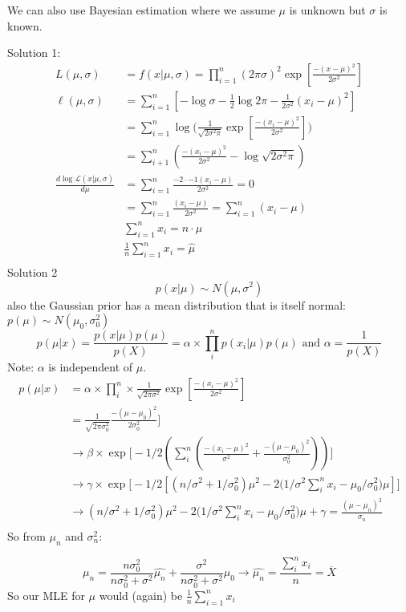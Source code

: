 \documentclass[draft]{exam} %
\theoremstyle{definition} \newtheorem*{defn}{Definition}
\begin{document}
\begin{questions}
\begin{solution}
We can also use Bayesian estimation where we assume $\mu$ is unknown but
$\sigma$ is known.

Solution 1:
\begin{align*}
L(\mu, \sigma) &= f(x|\mu,\sigma)= \prod_{i=1}^n (2\pi \sigma)^2 \exp [\frac{-(x-\mu)^2}{2\sigma^2}]\\
\ell(\mu,\sigma) &=\sum_{i=1}^n[- \log \sigma -\frac{1}{2} \log2 \pi-\frac{1}{2\sigma^2}(x_{i}-\mu)^2]\\
&= \sum_{i=1}^n \log \big(\frac{1}{\sqrt{2\sigma^2\pi}}\exp[\frac{-(x_i - \mu)^2}{2\sigma^2}]\big)\\
&= \sum_{i+1}^n(\frac{-(x_i-\mu)^2}{2\sigma^2} - \log \sqrt{2\sigma^2\pi})\\
\frac{d \log\mathcal{L}(x|\mu,\sigma)} {d \mu} &= \sum_{i=1}^n \frac{-2\cdot-1(x_i-\mu)}{2\sigma^2} = 0\\
&=\sum_{i=1}^n \frac{(x_i-\mu)}{2\sigma^2}
=\sum_{i=1}^n (x_i - \mu)\\
&\sum_{i=1}^n x_i = n\cdot\hat{\mu}\\
&\frac{1}{n} \sum_{i=1}^{n}x_i =  \hat{\mu}\\
\end{align*}
Solution 2
\[p(x|\mu)\sim N(\mu,\sigma^2)\]
also the Gaussian prior has a mean distribution that is itself normal: 
$p(\mu)\sim N(\mu_{0},\sigma_{0}^2)$
\[ p(\mu|x)=\frac{p(x|\mu)p(\mu)}{p(X)}=\alpha \times \prod_{i}^n p(x_{i}|\mu)p(\mu)\text{ and }\alpha=\frac{1}{p(X)}\]
Note: $\alpha$ is independent of $\mu$.
\begin{align*}
p(\mu|x) &= \alpha \times \prod_{i}^n \times \frac{1}{\sqrt{2\pi\sigma^2}} \exp[\frac{-(x_{i}-\mu)^2}{2\sigma^2}]\\
&= \frac{1}{\sqrt{2\pi\sigma_{0}^2}}\frac{-(\mu-\mu_{0})^2}{2\sigma_{0}^2}]\\
&\rightarrow \beta \times \exp \big[-1/2(\sum_{i}^n(\frac{-(x_{i}-\mu)^2}{\sigma^2}+\frac{-(\mu-\mu_{0})^2}{\sigma_{0}^2}))\big]\\
&\rightarrow \gamma \times \exp \big[-1/2[(n/\sigma^2 + 1/\sigma_{0}^2)\mu^2-2\big(1/\sigma^2\sum_{i}^n x_{i}-\mu_{0}/\sigma_{0}^2\big)\mu]\big]\\
&\rightarrow (n/\sigma^2 + 1/\sigma_{0}^2)\mu^2-2\big(1/\sigma^2\sum_{i}^n x_{i}-\mu_{0}/\sigma_{0}^2\big)\mu + \gamma = \frac{(\mu-\mu_{n})^2}{\sigma_{n}} \\
\end{align*}
So from $\mu_{n}$ and $\sigma_{n}^2$:

\[\mu_{n}=\frac{n\sigma_{0}^2}{n\sigma_{0}^2+\sigma^2}
\hat{\mu_{n}}+\frac{\sigma^2}{n\sigma_{0}^2+\sigma^2} \mu_{0} \rightarrow
\hat{\mu_{n}}=\frac{\sum_{i}^n x_{i}}{n} = \overline{X}\]
So our MLE for $\mu$ would (again) be $\frac{1}{n}\sum\limits_{i=1}^nx_i$


\end{solution}
\end{questions}
\end{document}
